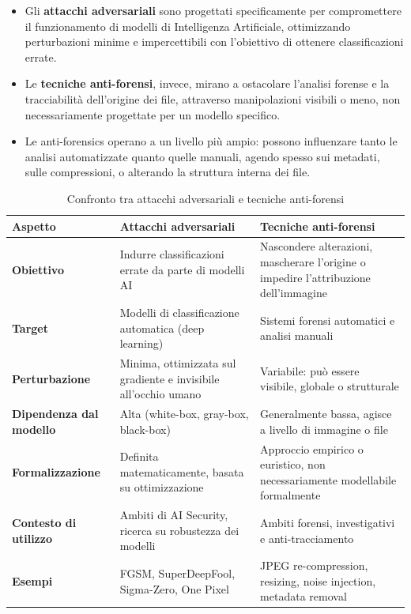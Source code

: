 \begin{itemize}
    \item Gli \textbf{attacchi adversariali} sono progettati specificamente per compromettere il funzionamento di modelli di Intelligenza Artificiale, ottimizzando perturbazioni minime e impercettibili con l’obiettivo di ottenere classificazioni errate.
    \item Le \textbf{tecniche anti-forensi}, invece, mirano a ostacolare l’analisi forense e la tracciabilità dell’origine dei file, attraverso manipolazioni visibili o meno, non necessariamente progettate per un modello specifico.
    \item Le anti-forensics operano a un livello più ampio: possono influenzare tanto le analisi automatizzate quanto quelle manuali, agendo spesso sui metadati, sulle compressioni, o alterando la struttura interna dei file.
\end{itemize}

\begin{table}[H]
\centering
\begin{tabularx}{\textwidth}{>{\raggedright\arraybackslash}p{4cm} >{\raggedright\arraybackslash}p{5cm} >{\raggedright\arraybackslash}X}
\toprule
\textbf{Aspetto} & \textbf{Attacchi adversariali} & \textbf{Tecniche anti-forensi} \\
\midrule
\textbf{Obiettivo} & Indurre classificazioni errate da parte di modelli AI & Nascondere alterazioni, mascherare l’origine o impedire l’attribuzione dell’immagine \\
\textbf{Target} & Modelli di classificazione automatica (deep learning) & Sistemi forensi automatici e analisi manuali \\
\textbf{Perturbazione} & Minima, ottimizzata sul gradiente e invisibile all'occhio umano & Variabile: può essere visibile, globale o strutturale \\
\textbf{Dipendenza dal modello} & Alta (white-box, gray-box, black-box) & Generalmente bassa, agisce a livello di immagine o file \\
\textbf{Formalizzazione} & Definita matematicamente, basata su ottimizzazione & Approccio empirico o euristico, non necessariamente modellabile formalmente \\
\textbf{Contesto di utilizzo} & Ambiti di AI Security, ricerca su robustezza dei modelli & Ambiti forensi, investigativi e anti-tracciamento \\
\textbf{Esempi} & FGSM, SuperDeepFool, Sigma-Zero, One Pixel & JPEG re-compression, resizing, noise injection, metadata removal \\
\bottomrule
\end{tabularx}
\caption{Confronto tra attacchi adversariali e tecniche anti-forensi}
\label{tab:confronto_adversarial_anti}
\end{table}



